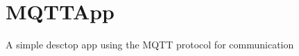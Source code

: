 \chapter{MQTTApp}
\hypertarget{index}{}\label{index}
\label{index_md__r_e_a_d_m_e}%
%
A simple desctop app using the MQTT protocol for communication 